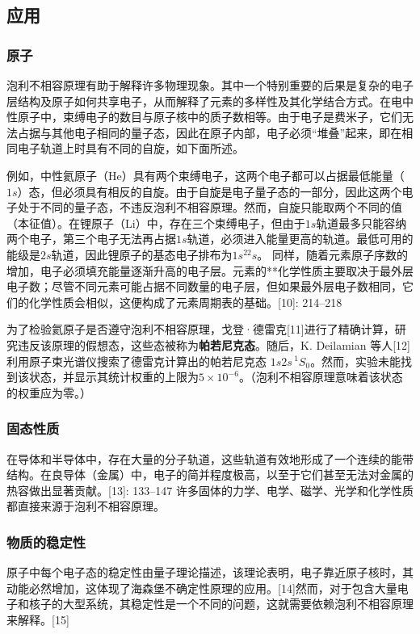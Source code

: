 \subsection{应用}  
\subsubsection{原子} 
泡利不相容原理有助于解释许多物理现象。其中一个特别重要的后果是复杂的电子层结构及原子如何共享电子，从而解释了元素的多样性及其化学结合方式。在电中性原子中，束缚电子的数目与原子核中的质子数相等。由于电子是费米子，它们无法占据与其他电子相同的量子态，因此在原子内部，电子必须“堆叠”起来，即在相同电子轨道上时具有不同的自旋，如下面所述。

例如，中性氦原子（He）具有两个束缚电子，这两个电子都可以占据最低能量（\(1s\)）态，但必须具有相反的自旋。由于自旋是电子量子态的一部分，因此这两个电子处于不同的量子态，不违反泡利不相容原理。然而，自旋只能取两个不同的值（本征值）。在锂原子（Li）中，存在三个束缚电子，但由于\(1s\)轨道最多只能容纳两个电子，第三个电子无法再占据\(1s\)轨道，必须进入能量更高的轨道。最低可用的能级是\(2s\)轨道，因此锂原子的基态电子排布为\(1s^22s\)。 同样，随着元素原子序数的增加，电子必须填充能量逐渐升高的电子层。元素的**化学性质主要取决于最外层电子数；尽管不同元素可能占据不同数量的电子层，但如果最外层电子数相同，它们的化学性质会相似，这便构成了元素周期表的基础。[10]: 214–218

为了检验氦原子是否遵守泡利不相容原理，戈登·德雷克[11]进行了精确计算，研究违反该原理的假想态，这些态被称为\textbf{帕若尼克态}。随后，K. Deilamian 等人[12] 利用原子束光谱仪搜索了德雷克计算出的帕若尼克态 \( 1s2s \,^1S_0 \)。然而，实验未能找到该状态，并显示其统计权重的上限为\( 5 \times 10^{-6} \)。（泡利不相容原理意味着该状态的权重应为零。）
\subsubsection{固态性质} 
在导体和半导体中，存在大量的分子轨道，这些轨道有效地形成了一个连续的能带结构。在良导体（金属）中，电子的简并程度极高，以至于它们甚至无法对金属的热容做出显著贡献。[13]: 133–147 许多固体的力学、电学、磁学、光学和化学性质都直接来源于泡利不相容原理。
\subsubsection{物质的稳定性}
原子中每个电子态的稳定性由量子理论描述，该理论表明，电子靠近原子核时，其动能必然增加，这体现了海森堡不确定性原理的应用。[14]然而，对于包含大量电子和核子的大型系统，其稳定性是一个不同的问题，这就需要依赖泡利不相容原理来解释。[15]

